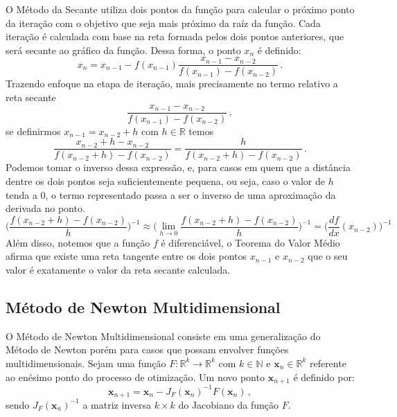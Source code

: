 O Método da Secante utiliza dois pontos da função para calcular o próximo ponto da iteração com o objetivo que seja mais próximo da raíz da função. Cada iteração é calculada com base na reta formada pelos dois pontos anteriores, que será secante ao gráfico da função. Dessa forma, o ponto $x_n$ é definido:
%
\begin{equation}
  x_n = x_{n-1} - f(x_{n-1}) \frac{x_{n-1} - x_{n-2}}{f(x_{n-1}) - f(x_{n-2})} \,.
\end{equation}
%
Trazendo enfoque na etapa de iteração, mais precisamente no termo relativo a reta secante
%
\begin{equation}
  \frac{x_{n-1} - x_{n-2}}{f(x_{n-1}) - f(x_{n-2})} \,,
\end{equation}
%
se definirmos $x_{n-1} = x_{n-2} + h$ com $h \in \mathds{R}$ temos
%
\begin{equation}
  \frac{x_{n-2} + h - x_{n-2}}{f(x_{n-2} + h) - f(x_{n-2})} = \frac{h}{f(x_{n-2} + h) - f(x_{n-2})} \,.
\end{equation}
%
Podemos tomar o inverso dessa expressão, e, para casos em quem que a distância dentre os dois pontos seja suficientemente pequena, ou seja, caso o valor de $h$ tenda a $0$, o termo representado passa a ser o inverso de uma aproximação da derivada no ponto.
%
\begin{equation}
  \Bigg( \frac{f(x_{n-2} + h) - f(x_{n-2})}{h} \Bigg)^{-1} \approx \Bigg( \lim\limits_{h\to0}\frac{f(x_{n-2}+h)-f(x_{n-2})}{h} \Bigg)^{-1} = \Bigg( \frac{df}{dx}(x_{n-2}) \Bigg)^{-1}
\end{equation}
%
Além disso, notemos que a função $f$ é diferenciável, o Teorema do Valor Médio\cite{calculo_1} afirma que existe uma reta tangente entre os dois pontos $x_{n-1}$ e $x_{n-2}$ que o seu valor é exatamente o valor da reta secante calculada.

\subsection{Método de Newton Multidimensional}

O Método de Newton Multidimensional consiste em uma generalização do Método de Newton porém para casos que possam envolver funções multidimensionais. Sejam uma função $F: {\mathds{R}^k\to\mathds{R}^k}$ com $k \in \mathds{N}$ e $\mathbf{x}_n \in \mathds{R}^k$ referente ao enésimo ponto do processo de otimização. Um novo ponto $\mathbf{x}_{n+1}$ é definido por:
%
\begin{equation}
  \label{eq:newton_generalization}
  \mathbf{x}_{n+1} = \mathbf{x}_n - J_F(\mathbf{x}_n)^{-1}F(\mathbf{x}_n) \,,
\end{equation}
%
sendo $J_F(\mathbf{x}_n)^{-1}$ a matriz inversa $k \times k$ do Jacobiano da função $F$.


